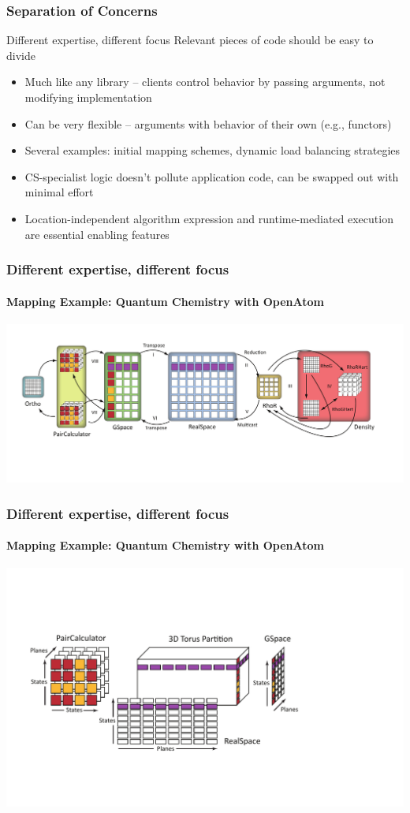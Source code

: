 \begin{frame}
\frametitle{Separation of Concerns}
\begin{block}{Different expertise, different focus}
Relevant pieces of code should be easy to divide
\end{block}
\begin{itemize}
\item Much like any library -- clients control behavior by passing
  arguments, not modifying implementation
\item Can be very flexible -- arguments with behavior of their own
  (e.g., functors)
\item Several examples: initial mapping schemes, dynamic load
  balancing strategies
\item CS-specialist logic doesn't pollute application code, can be
  swapped out with minimal effort
\item Location-independent algorithm expression and runtime-mediated
  execution are essential enabling features
\end{itemize}
\end{frame}


\begin{frame}
\frametitle{Different expertise, different focus}
\framesubtitle{Mapping Example: Quantum Chemistry with {\sc OpenAtom}}
\includegraphics[width=\textwidth]{../figures/openatom/control-flow.pdf}
\end{frame}

\begin{frame}
\frametitle{Different expertise, different focus}
\framesubtitle{Mapping Example: Quantum Chemistry with {\sc OpenAtom}}
\includegraphics[width=0.9\textheight]{../figures/openatom/mapping.pdf}
\end{frame}


